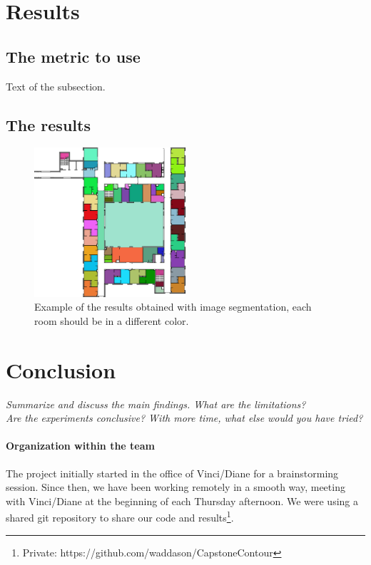 \documentclass[11pt]{article}
\begin{document}
\section{Results}

\subsection{The metric to use}
Text of the subsection.

\subsection{The results}
\begin{figure}[h]
    \centering
    \includegraphics[width=0.5\textwidth]{figures/Output6_contours_image.png}

    \caption{Example of the results obtained with image segmentation, each room 
    should be in a different color.}
    \label{fig:result_segmentation}
\end{figure}
\section{Conclusion}
\textit{Summarize and discuss the main findings. What are the limitations?\\
Are the experiments conclusive? With more time, what else would you have tried?}

\paragraph{Organization within the team}
The project initially started in the office of Vinci/Diane for a brainstorming session.
Since then, we have been working remotely in a smooth way, meeting with 
Vinci/Diane at the beginning of each Thursday afternoon. We were using a shared 
git repository to share our code and results\footnote{Private: https://github.com/waddason/CapstoneContour}.
\end{document}
